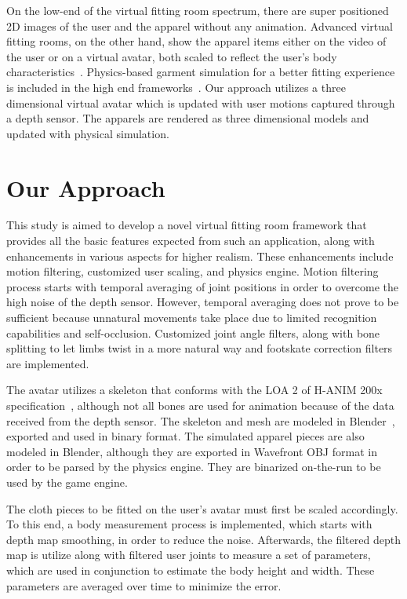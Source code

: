 On the low-end of the virtual fitting room spectrum, there are super positioned 2D images of the user and the apparel without any animation. Advanced virtual fitting rooms, on the other hand, show the apparel items either on the video of the user or on a virtual avatar, both scaled to reflect the user's body characteristics~\cite{FaceCake2013}. Physics-based garment simulation for a better fitting experience is included in the high end frameworks~\cite{Styku2013}. Our approach utilizes a three dimensional virtual avatar which is updated with user motions captured through a depth sensor. The apparels are rendered as three dimensional models and updated with physical simulation.  

\section{Our Approach}

This study is aimed to develop a novel virtual fitting room framework that provides all the basic features expected from such an application, along with enhancements in various aspects for higher realism. These enhancements include motion filtering, customized user scaling, and physics engine. Motion filtering process starts with temporal averaging of joint positions in order to overcome the high noise of the depth sensor. However, temporal averaging does not prove to be sufficient because unnatural movements take place due to limited recognition capabilities and self-occlusion. Customized joint angle filters, along with bone splitting to let limbs twist in a more natural way and footskate correction filters are implemented.

The avatar utilizes a skeleton that conforms with the LOA 2 of H-ANIM 200x specification~\cite{HANIM}, although not all bones are used for animation because of the data received from the depth sensor. The skeleton and mesh are modeled in Blender~\cite{Blender}, exported and used in binary format. The simulated apparel pieces are also modeled in Blender, although they are exported in Wavefront OBJ format in order to be parsed by the physics engine. They are binarized on-the-run to be used by the game engine. 

The cloth pieces to be fitted on the user's avatar must first be scaled accordingly. To this end, a body measurement process is implemented, which starts with depth map smoothing, in order to reduce the noise. Afterwards, the filtered depth map is utilize along with filtered user joints to measure a set of parameters, which are used in conjunction to estimate the body height and width. These parameters are averaged over time to minimize the error.

